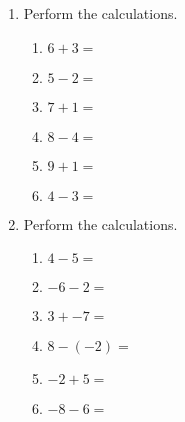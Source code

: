 \documentclass[12pt, twoside]{article}
\begin{document}
\begin{enumerate}
    \item Perform the calculations.
      \begin{multicols}{2}
        \begin{enumerate}[itemsep=0.75cm]
          \item $6 + 3 =$
          \item $5 - 2 =$
          \item $7 + 1 =$
          \item $8 - 4 =$
          \item $9 + 1 =$
          \item $4 - 3 =$
        \end{enumerate}
        \end{multicols} \vspace{0.25cm}

    \item Perform the calculations.
      \begin{multicols}{2}
        \begin{enumerate}[itemsep=0.75cm]
          \item $4 - 5 =$
          \item $-6 - 2 =$
          \item $3 + -7 =$
          \item $8 - (-2) =$
          \item $-2 + 5 =$
          \item $-8 - 6 =$
        \end{enumerate}
        \end{multicols} 

\end{enumerate}
\end{document}
